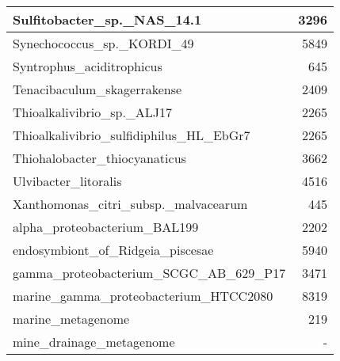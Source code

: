 \documentclass[12pt,a4paper]{article}
\begin{document}
\begin{table}[ht]
\begin{center}
\begin{tabular}{|l*{1}{|r}|}
Sulfitobacter\_sp.\_NAS\_14.1 & 3296 \\ \hline
Synechococcus\_sp.\_KORDI\_49 & 5849 \\ \hline
Syntrophus\_aciditrophicus & 645 \\ \hline
Tenacibaculum\_skagerrakense & 2409 \\ \hline
Thioalkalivibrio\_sp.\_ALJ17 & 2265 \\ \hline
Thioalkalivibrio\_sulfidiphilus\_HL\_EbGr7 & 2265 \\ \hline
Thiohalobacter\_thiocyanaticus & 3662 \\ \hline
Ulvibacter\_litoralis & 4516 \\ \hline
Xanthomonas\_citri\_subsp.\_malvacearum & 445 \\ \hline
alpha\_proteobacterium\_BAL199 & 2202 \\ \hline
endosymbiont\_of\_Ridgeia\_piscesae & 5940 \\ \hline
gamma\_proteobacterium\_SCGC\_AB\_629\_P17 & 3471 \\ \hline
marine\_gamma\_proteobacterium\_HTCC2080 & 8319 \\ \hline
marine\_metagenome & 219 \\ \hline
mine\_drainage\_metagenome & - \\ \hline
\end{tabular}
\end{center}
\end{table}
\end{document}
